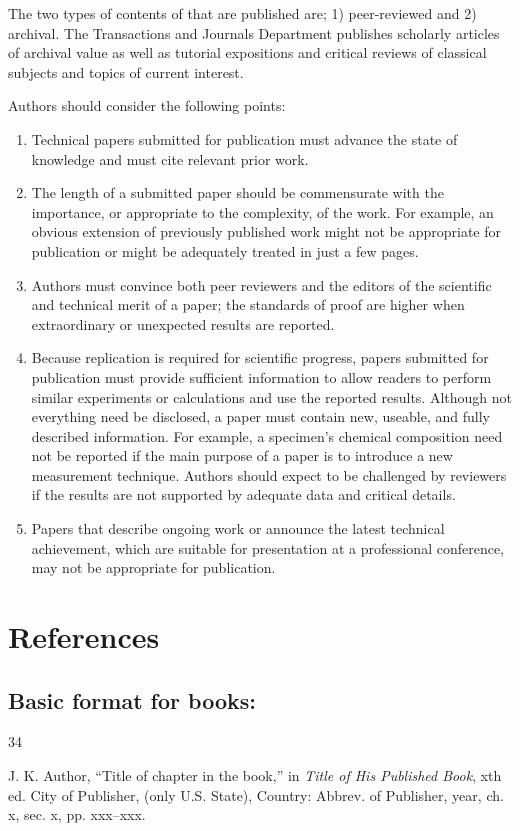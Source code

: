 \documentclass[journal]{IEEEtai}
\begin{document}
The two types of contents of that are published are; 1) peer-reviewed and 2) archival. The Transactions and Journals Department publishes scholarly articles of archival value as well as tutorial expositions and critical reviews of classical subjects and topics of current interest. 

Authors should consider the following points:
\begin{enumerate}
\item[1)]Technical papers submitted for publication must advance the state of knowledge and must cite relevant prior work. 

\item[2)]The length of a submitted paper should be commensurate with the importance, or appropriate to the complexity, of the work. For example, an obvious extension of previously published work might not be appropriate for publication or might be adequately treated in just a few pages.

\item[3)]Authors must convince both peer reviewers and the editors of the scientific and technical merit of a paper; the standards of proof are higher when extraordinary or unexpected results are reported. 

\item[4)]Because replication is required for scientific progress, papers submitted for publication must provide sufficient information to allow readers to perform similar experiments or calculations and use the reported results. Although not everything need be disclosed, a paper must contain new, useable, and fully described information. For example, a specimen's chemical composition need not be reported if the main purpose of a paper is to introduce a new measurement technique. Authors should expect to be challenged by reviewers if the results are not supported by adequate data and critical details.

\item[5)]Papers that describe ongoing work or announce the latest technical achievement, which are suitable for presentation at a professional conference, may not be appropriate for publication.
\end{enumerate}

\section*{References}

\subsection*{Basic format for books:}\vspace*{-12pt}
\def\refname{}
\begin{thebibliography}{34}
\item[] J. K. Author, ``Title of chapter in the book,'' in {\em Title of His Published Book}, xth ed. City of Publisher, (only U.S. State), Country: Abbrev. of Publisher, year, ch. x, sec. x, pp. xxx--xxx.
\end{thebibliography}
\end{document}

